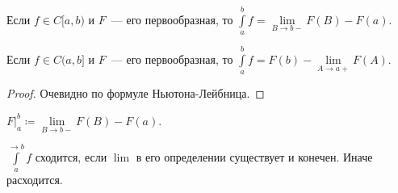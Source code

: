 \begin{remark}
    Если $f \in C[a, b)$ и  $F$~--- его первообразная, то  $\int\limits_a^b f = \lim\limits_{B \to b-}F(B) - F(a)$.

    Если $f \in C(a, b]$ и  $F$~--- его первообразная, то  $\int\limits_a^b f = F(b) - \lim\limits_{A \to a+}F(A)$.
\end{remark}
\begin{proof}
    Очевидно по формуле Ньютона-Лейбница.
\end{proof}
\begin{definition}
    $F \Big|_a^b \coloneqq \lim\limits_{B \to b-} F(B) - F(a)$.
\end{definition}

\begin{definition}
    $\int\limits_a^{\to b} f$ сходится, если  $\lim$ в его определении существует и конечен. Иначе расходится.
\end{definition}

